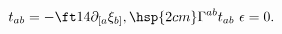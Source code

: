 \begin{equation}
\label{sol}
t_{ab}=-\ft14 \partial_{[a} \xi_{b]}, 
\hsp{2cm}
\Gamma^{ab} t_{ab} \ \epsilon = 0.
\end{equation}


